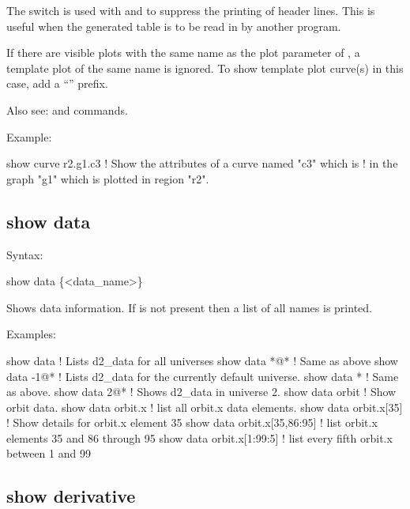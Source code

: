 {{{{{{{{The  switch is used with  and  to suppress the printing of
header lines. This is useful when the generated table is to be read in by another program.

If there are visible plots with the same name as the plot parameter of , a template plot
of the same name is ignored. To show template plot curve(s) in this case, add a ``'' prefix.

Also see:  and  commands.

Example:
\begin{example}
  show curve r2.g1.c3     ! Show the attributes of a curve named "c3" which is 
                          !   in the graph "g1" which is plotted in region "r2".
\end{example}


\subsection{show data}
\label{s:show.data}

Syntax:
\begin{example}
  show data \{<data_name>\}
\end{example}

Shows data information. If  is not present then a list of all  names is
printed.

Examples:
\begin{example}
  show data                   ! Lists d2_data for all universes
  show data *@*               ! Same as above
  show data -1@*              ! Lists d2_data for the currently default universe.
  show data *                 ! Same as above.
  show data 2@*               ! Shows d2_data in universe 2.
  show data orbit             ! Show orbit data.
  show data orbit.x           ! list all orbit.x data elements.
  show data orbit.x[35]       ! Show details for orbit.x element 35
  show data orbit.x[35,86:95] ! list orbit.x elements 35 and 86 through 95
  show data orbit.x[1:99:5]   ! list every fifth orbit.x between 1 and 99  
\end{example}


\subsection{show derivative}
\label{s:show.derivative}

}}}}}}}}

